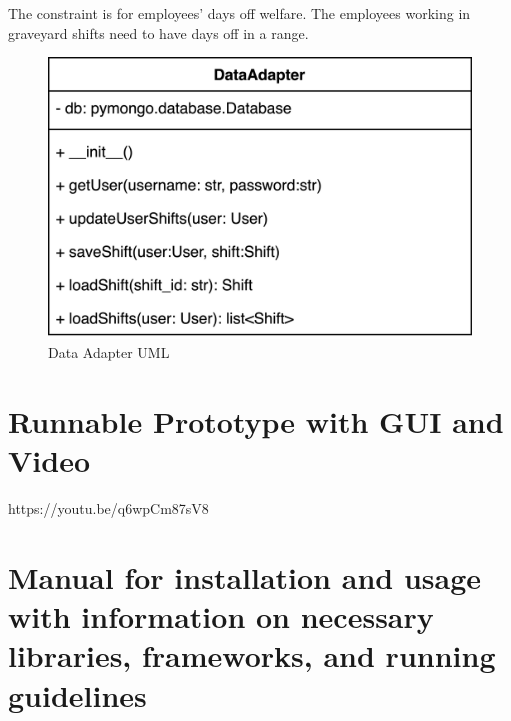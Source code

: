 \documentclass[11pt, oneside]{article}   	%
\begin{document}
The constraint is for employees' days off welfare. The employees working in graveyard shifts need to have days off in a range.


\begin{figure}
\centering
\includegraphics[scale=0.05]{dataadapter}
\caption{Data Adapter UML}
\label{dataadapteruml}
\end{figure}

\section{Runnable Prototype with GUI and Video}
https://youtu.be/q6wpCm87sV8

\section{Manual for installation and usage with information on necessary libraries, frameworks, and running guidelines}
\end{document}
